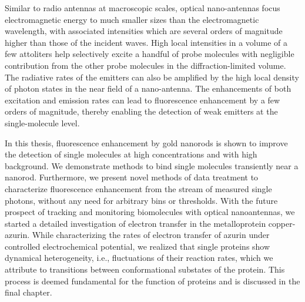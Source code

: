 Similar to radio antennas at macroscopic scales, optical nano-antennas focus electromagnetic energy to much smaller sizes than the electromagnetic wavelength, with associated intensities which are several orders of magnitude higher than those of the incident waves.
High local intensities in a volume of a few attoliters help selectively excite a handful of probe molecules with negligible contribution from the other probe molecules in the diffraction-limited volume.
The radiative rates of the emitters can also be amplified by the high local density of photon states in the near field of a nano-antenna.
The enhancements of both excitation and emission rates can lead to fluorescence enhancement by a few orders of magnitude, thereby enabling the detection of weak emitters at the single-molecule level.


In this thesis, fluorescence enhancement by gold nanorods is shown to improve the detection of single molecules at high concentrations and with high background.
We demonstrate methods to bind single molecules transiently near a nanorod.
Furthermore, we present novel methods of data treatment to characterize fluorescence enhancement from the stream of measured single photons, without any need for arbitrary bins or thresholds.
With the future prospect of tracking and monitoring biomolecules with optical nanoantennas, we started a detailed investigation of electron transfer in the metalloprotein copper-azurin.
While characterizing the rates of electron transfer of azurin under controlled electrochemical potential, we realized that single proteins show dynamical heterogeneity, i.e., fluctuations of their reaction rates, which we attribute to transitions between conformational substates of the protein.
This process is deemed fundamental for the function of proteins and is discussed in the final chapter.


